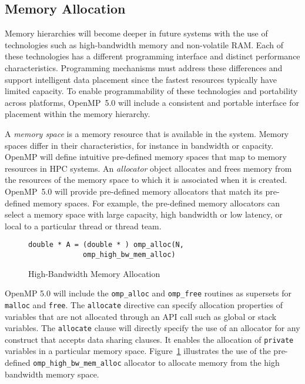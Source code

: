 \subsection{Memory Allocation}
\label{sub:allocators_and_hierarchical_memory}

Memory hierarchies will become deeper in future systems with the use of 
technologies such as high-bandwidth memory and non-volatile RAM. Each 
of these technologies has a different programming interface and distinct
performance characteristics. Programming mechanisms must address these 
differences and support intelligent data placement since the fastest resources
typically have limited capacity. To enable programmability of these 
technologies and portability across platforms, OpenMP~5.0 will include a 
consistent and portable interface for placement within the memory hierarchy.

A \emph{memory space} is a memory resource that is available in the system.
Memory spaces differ in their characteristics, for instance in bandwidth or 
capacity. OpenMP will define intuitive pre-defined memory spaces that map to 
memory resources in HPC systems. An \emph{allocator} object allocates and 
frees memory from the resources of the memory space to which it is associated 
when it is created. OpenMP~5.0 will provide pre-defined memory allocators that
match its pre-defined memory spaces. For example, the pre-defined memory 
allocators can select a memory space with large capacity, high bandwidth or 
low latency, or local to a particular thread or thread team.

\begin{figure}
\begin{verbatim}
double * A = (double * ) omp_alloc(N,
             omp_high_bw_mem_alloc)
\end{verbatim}
\caption{High-Bandwidth Memory Allocation\label{fig:allocators}}
\end{figure}

OpenMP 5.0 will include the \texttt{omp\_alloc} and \texttt{omp\_free} 
routines as supersets for \texttt{malloc} and \texttt{free}. The 
\texttt{allocate} directive can specify allocation properties of variables 
that are not allocated through an API call such as global or stack variables. 
The \texttt{allocate} clause will directly specify the use of an allocator 
for any construct that accepts data sharing clauses. It enables the allocation
of \texttt{private} variables in a particular memory space. 
Figure~\ref{fig:allocators} illustrates the use of the pre-defined 
\texttt{omp\_high\_bw\_mem\_alloc} allocator to allocate memory from the 
high bandwidth memory space.


